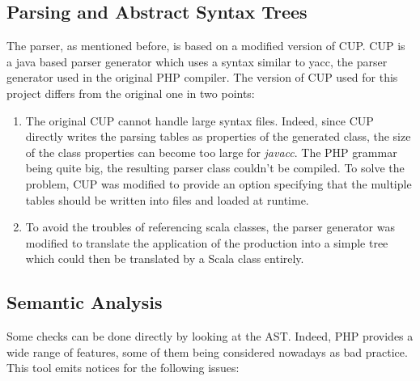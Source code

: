 \documentclass[a4paper]{article}
\begin{document}
\subsection{Parsing and Abstract Syntax Trees}
The parser, as mentioned before, is based on a modified version of CUP. CUP is
a java based parser generator which uses a syntax similar to yacc, the parser
generator used in the original PHP compiler. The version of CUP used for this
project differs from the original one in two points:
\begin{enumerate}
  \item The original CUP cannot handle large syntax files. Indeed, since CUP
    directly writes the parsing tables as properties of the generated class,
    the size of the class properties can become too large for \emph{javacc}. The
    PHP grammar being quite big, the resulting parser class couldn't be compiled.
    To solve the problem, CUP was modified to provide an option specifying that
    the multiple tables should be written into files and loaded at runtime.
  \item To avoid the troubles of referencing scala classes, the parser
    generator was modified to translate the application of the production into a
    simple tree which could then be translated by a Scala class entirely.
\end{enumerate}

\subsection{Semantic Analysis}
Some checks can be done directly by looking at the AST. Indeed, PHP provides a
wide range of features, some of them being considered nowadays as bad practice.
This tool emits notices for the following issues:
\end{document}
